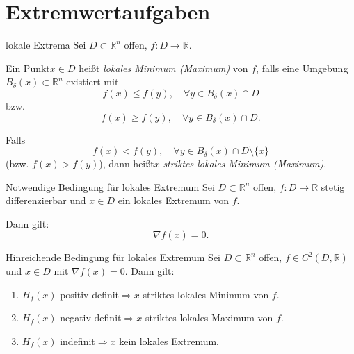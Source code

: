 \newpage
\section{Extremwertaufgaben}
\label{4.5}

\begin{definition}{lokale Extrema}
    Sei $D\subset\mathbb{R}^n$ offen, $f: D \to \mathbb{R}$.

    \medskip

    Ein Punkt$x\in D$ heißt \emph{lokales Minimum (Maximum)} von $f$, falls eine Umgebung$B_{\delta}(x)\subset\mathbb{R}^n$ existiert mit
    $$
    f(x)\le f(y),\quad \forall y\in B_{\delta}(x)\cap D
    $$
    bzw.
    $$
    f(x)\ge f(y),\quad \forall y\in B_{\delta}(x)\cap D.
    $$

    Falls
    $$
    f(x)< f(y),\quad \forall y\in B_{\delta}(x)\cap D\setminus\{x\}
    $$
    (bzw. $f(x)>f(y)$),
    dann heißt$x$ \emph{striktes lokales Minimum (Maximum)}.
\end{definition}

\begin{satz}{Notwendige Bedingung für lokales Extremum}
    Sei $D\subset\mathbb{R}^n$ offen, $f\colon D\to\mathbb{R}$ stetig differenzierbar und $x\in D$ ein lokales Extremum von $f$.

    Dann gilt:
    $$
    \nabla f(x)=0.
    $$
\end{satz}

\begin{satz}{Hinreichende Bedingung für lokales Extremum}
    Sei $D\subset\mathbb{R}^n$ offen, $f\in C^2(D,\mathbb{R})$ und $x\in D$ mit $\nabla f(x)=0$. Dann gilt:
    \begin{enumerate}
        \item$H_f(x)$ positiv definit$\Longrightarrow$$x$ striktes lokales Minimum von $f$.
        \item$H_f(x)$ negativ definit$\Longrightarrow$$x$ striktes lokales Maximum von $f$.
        \item$H_f(x)$ indefinit$\Longrightarrow$$x$ kein lokales Extremum.
    \end{enumerate}
\end{satz}